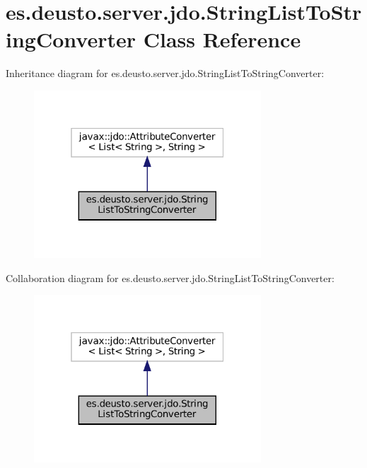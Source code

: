 \hypertarget{classes_1_1deusto_1_1server_1_1jdo_1_1_string_list_to_string_converter}{}\section{es.\+deusto.\+server.\+jdo.\+String\+List\+To\+String\+Converter Class Reference}
\label{classes_1_1deusto_1_1server_1_1jdo_1_1_string_list_to_string_converter}


Inheritance diagram for es.\+deusto.\+server.\+jdo.\+String\+List\+To\+String\+Converter\+:\nopagebreak
\begin{figure}[H]
\begin{center}
\leavevmode
\includegraphics[width=241pt]{classes_1_1deusto_1_1server_1_1jdo_1_1_string_list_to_string_converter__inherit__graph}
\end{center}
\end{figure}


Collaboration diagram for es.\+deusto.\+server.\+jdo.\+String\+List\+To\+String\+Converter\+:\nopagebreak
\begin{figure}[H]
\begin{center}
\leavevmode
\includegraphics[width=241pt]{classes_1_1deusto_1_1server_1_1jdo_1_1_string_list_to_string_converter__coll__graph}
\end{center}
\end{figure}
